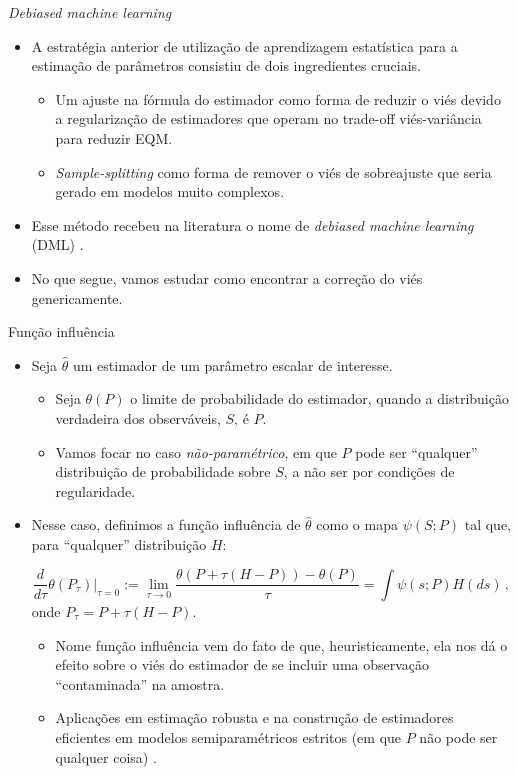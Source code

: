 \documentclass[11pt]{beamer}
\begin{document}
\begin{frame}{\textit{Debiased machine learning}}
\begin{itemize}
	\item A estratégia anterior de utilização de aprendizagem estatística para a estimação de parâmetros consistiu de dois ingredientes cruciais.
	\begin{itemize}
		\item Um ajuste na fórmula do estimador como forma de reduzir o viés devido a regularização de estimadores que operam no trade-off viés-variância para reduzir EQM.
		\item \textit{Sample-splitting} como forma de remover o viés de sobreajuste que seria gerado em modelos muito complexos.
	\end{itemize}
	\item Esse método recebeu na literatura o nome de \textit{debiased machine learning} (DML) \citep{Chernozhukov2018}.
	\item No que segue, vamos estudar como encontrar a correção do viés genericamente.
\end{itemize}
\end{frame}

\begin{frame}{Função influência}
	\begin{itemize}
		\item Seja $\hat{\theta}$ um estimador de um parâmetro escalar de interesse.
		\begin{itemize}
			\item Seja $\theta(P)$ o limite de probabilidade do estimador, quando a distribuição verdadeira dos observáveis, $S$, é $P$.
			\item Vamos focar no caso \textit{não-paramétrico}, em que $P$ pode ser ``qualquer'' distribuição de probabilidade sobre $S$, a não ser por condições de regularidade.
		\end{itemize}
		\item Nesse caso, definimos a função influência de $\hat{\theta}$ como o mapa $\psi(S;P)$ tal que, para ``qualquer'' distribuição $H$:
		
	$$\frac{d}{d\tau}\theta(P_{\tau})\Big|_{\tau = 0}:=\lim_{\tau \to 0 } \frac{\theta( P + \tau(H-P))-\theta( P)}{\tau} = \int \psi(s;P) H(ds)\,,$$
	onde $P_{\tau} = P + \tau(H-P)$.
	\begin{itemize}
		\item Nome função influência vem do fato de que, heuristicamente, ela nos dá o efeito sobre o viés do estimador de se incluir uma observação ``contaminada'' na amostra.
		\item Aplicações em estimação robusta \citep{rousseeuw1986robust} e na construção de estimadores eficientes em modelos semiparamétricos estritos (em que $P$ não pode ser qualquer coisa) \citep{newey1990semiparametric,bickel1993efficient}.
	\end{itemize}
	\end{itemize}
\end{frame}
\end{document}
